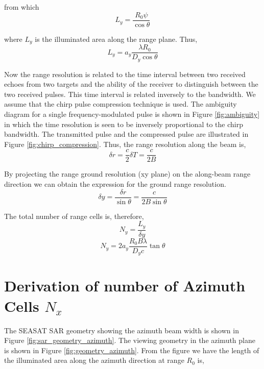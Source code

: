 from which 
\begin{equation}
\label{ }
L_y=\frac{R_0\psi}{\cos \theta }
\end{equation}

where $L_y$ is the illuminated area along the range plane. Thus,
\begin{equation}
\label{ }
L_y=a_y\frac{\lambda R_0}{D_y \cos \theta}
\end{equation}

Now the range resolution is related to the time interval between two received echoes from two targets and the ability of the receiver to distinguish between the two received pulses. This time interval is related inversely to the bandwidth. We assume that the chirp pulse compression technique is used. The ambiguity diagram for a single frequency-modulated pulse is shown in Figure \ref{fig:ambiguity} in which the time resolution is seen to be inversely proportional to the chirp bandwidth. The transmitted pulse and the compressed pulse are illustrated in Figure \ref{fig:chirp_compression}. Thus, the range resolution along the beam is, 
\begin{equation}
\label{ }
\delta r = \frac{c}{2} \delta T = \frac{c}{2B}
\end{equation}

By projecting the range ground resolution (xy plane) on the along-beam range direction we can obtain the expression for the ground range resolution.
\begin{equation}
\label{ }
\delta y = \frac{\delta r}{\sin \theta } = \frac{c}{2B \sin \theta }
\end{equation}

The total number of range cells is, therefore,
\begin{equation}
\label{ }
N_y=\frac{L_y}{\delta y}
\end{equation}
\begin{equation}
\label{ }
N_y=2 a_y\frac{R_0B\lambda}{D_y c} \tan \theta
\end{equation}

\chapter{Derivation of number of Azimuth Cells $N_x$}
The SEASAT SAR geometry showing the azimuth beam width is shown in Figure \ref{fig:sar_geometry_azimuth}. The viewing geometry in the azimuth plane  is shown in Figure   \ref{fig:geometry_azimuth}. From the figure we have the length of the illuminated area along the azimuth direction at range $R_0$ is,

